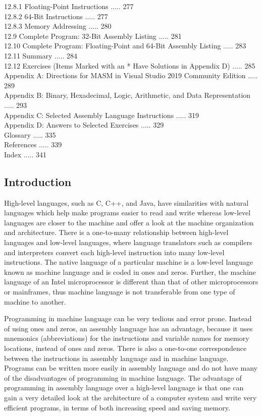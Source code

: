 \documentclass[10pt]{book}
\begin{document}
12.8.1 Floating-Point Instructions ..... 277\\
12.8.2 64-Bit Instructions ..... 277\\
12.8.3 Memory Addressing ..... 280\\
12.9 Complete Program: 32-Bit Assembly Listing ..... 281\\
12.10 Complete Program: Floating-Point and 64-Bit Assembly Listing ..... 283\\
12.11 Summary ..... 284\\
12.12 Exercises (Items Marked with an * Have Solutions in Appendix D) ..... 285\\

Appendix A: Directions for MASM in Visual Studio 2019 Community Edition ..... 289\\
Appendix B: Binary, Hexadecimal, Logic, Arithmetic, and Data Representation ..... 293\\
Appendix C: Selected Assembly Language Instructions ..... 319\\
Appendix D: Answers to Selected Exercises ..... 329\\
Glossary ..... 335\\
References ..... 339\\
Index ..... 341

\subsection{Introduction}
High-level languages, such as C, C++, and Java, have similarities with natural languages which help make programs easier to read and write whereas low-level languages are closer to the machine and offer a look at the machine organization and architecture. There is a one-to-many relationship between high-level languages and low-level languages, where language translators such as compilers and interpreters convert each high-level instruction into many low-level instructions. The native language of a particular machine is a low-level language known as machine language and is coded in ones and zeros. Further, the machine language of an Intel microprocessor is different than that of other microprocessors or mainframes, thus machine language is not transferable from one type of machine to another.


Programming in machine language can be very tedious and error prone. Instead of using ones and zeros, an assembly language has an advantage, because it uses mnemonics (abbreviations) for the instructions and variable names for memory locations, instead of ones and zeros. There is also a one-to-one correspondence between the instructions in assembly language and in machine language. Programs can be written more easily in assembly language and do not have many of the disadvantages of programming in machine language. The advantage of programming in assembly language over a high-level language is that one can gain a very detailed look at the architecture of a computer system and write very efficient programs, in terms of both increasing speed and saving memory.
\end{document}
